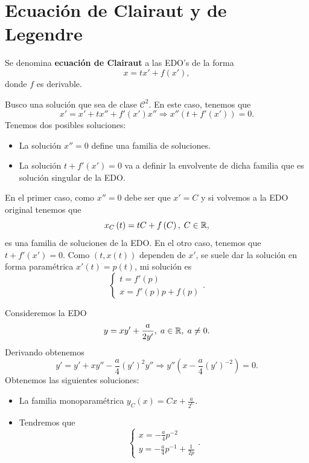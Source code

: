 \section{Ecuación de Clairaut y de Legendre}
\begin{definition}
Se denomina \textbf{ecuación de Clairaut} a las EDO's de la forma
\[x = tx' + f\left(x'\right) ,\]
donde $\displaystyle f $ es derivable.  
\end{definition}
\begin{observation}
Busco una solución que sea de clase $\displaystyle \mathcal{C}^{2} $. En este caso, tenemos que 
\[x' = x' + tx'' + f'\left(x'\right)x'' \Rightarrow x''\left(t+f'\left(x'\right)\right)=0 .\]
Tenemos dos posibles soluciones:
\begin{itemize}
\item La solución $\displaystyle x'' = 0 $ define una familia de soluciones.
\item La solución $\displaystyle t + f'\left(x'\right) = 0 $ va a definir la envolvente de dicha familia que es solución singular de la EDO. 
\end{itemize}
En el primer caso, como $\displaystyle x'' = 0 $ debe ser que $\displaystyle x' = C $ y si volvemos a la EDO original tenemos que 
\[x_{C}\left(t\right)=tC + f\left(C\right), \; C \in \mathbb{R} ,\]
es una familia de soluciones de la EDO. En el otro caso, tenemos que $\displaystyle t +f'\left(x'\right)=0 $. Como $\displaystyle \left(t, x\left(t\right)\right) $ dependen de $\displaystyle x' $, se suele dar la solución en forma paramétrica $\displaystyle x'\left(t\right)=p\left(t\right) $, mi solución es
\[
\begin{cases}
t = f'\left(p\right) \\
x = f'\left(p\right)p + f\left(p\right)
\end{cases}
.\]
\end{observation}
\begin{eg}
Consideremos la EDO 
\[ y = xy' + \frac{a}{2y'}, \; a \in \mathbb{R}, \; a \neq 0 .\]
Derivando obtenemos 
\[y' = y' + xy'' -\frac{a}{4}\left(y'\right)^{2}y'' \Rightarrow y''\left(x-\frac{a}{4}\left(y'\right)^{-2}\right)=0 .\]
Obtenemos las siguientes soluciones:
\begin{itemize}
\item La familia monoparamétrica $\displaystyle y_{C}\left(x\right)=Cx + \frac{a}{2^{C}} $. 
\item Tendremos que 
	\[
	\begin{cases}
	x = -\frac{a}{4}p^{-2} \\
	y = - \frac{a}{4}p^{-1}+\frac{1}{2p}
	\end{cases}
	.\]
\end{itemize}
\end{eg}

